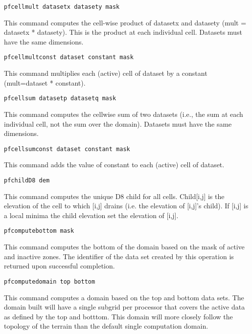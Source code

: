 \begin{description}
\item{\begin{verbatim}pfcellmult datasetx datasety mask\end{verbatim}}
This command computes the cell-wise product of datasetx and datasety (mult = datasetx * datasety).
This is the product at each individual cell. Datasets must have the same dimensions.

\item{\begin{verbatim}pfcellmultconst dataset constant mask\end{verbatim}}
This command multiplies each (active) cell of dataset by a constant (mult=dataset * constant).


\item{\begin{verbatim}pfcellsum datasetp datasetq mask\end{verbatim}}
This command computes the cellwise sum of two datasets (i.e., the sum at each
individual cell, not the sum over the domain). Datasets must have the same
dimensions.


\item{\begin{verbatim}pfcellsumconst dataset constant mask\end{verbatim}}
This command adds the value of constant to each (active) cell of dataset.

\item{\begin{verbatim}pfchildD8 dem\end{verbatim}}
This command computes the unique D8 child for all cells. Child[i,j] is the
elevation of the cell to which [i,j] drains (i.e. the elevation of [i,j]'s
child). If [i,j] is a local minima the child elevation set the elevation of [i,j].

\item{\begin{verbatim}pfcomputebottom mask\end{verbatim}}
This command computes the bottom of the domain based on the mask of active and inactive zones.
The identifier of the data set created by this operation is returned upon successful completion.

\item{\begin{verbatim}pfcomputedomain top bottom\end{verbatim}} This
 command computes a domain based on the top and bottom data sets.  The
 domain built will have a single subgrid per processor that covers the
 active data as defined by the top and botttom.  This domain will more
 closely follow the topology of the terrain than the default single
 computation domain.


\end{description}
